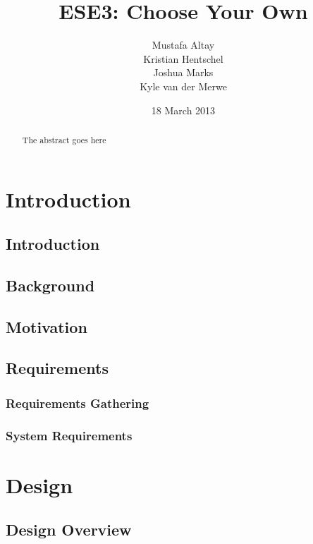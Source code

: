 \documentclass{l3proj}
\begin{document}
\title{ESE3: Choose Your Own}
\author{Mustafa Altay\\
        Kristian Hentschel \\
        Joshua Marks \\
        Kyle van der Merwe}
\date{18 March 2013}
\maketitle
\begin{abstract}

The abstract goes here

\end{abstract}
\educationalconsent
\tableofcontents
\chapter{Introduction}
\label{intro}
\section{Introduction}

\section{Background}

\section{Motivation}

\section{Requirements}
\label{requirements}

\subsection{Requirements Gathering}
\label{gathering}

\subsection{System Requirements}
\label{system}

\chapter{Design}
\label{design}
\section{Design Overview}

\end{document}
